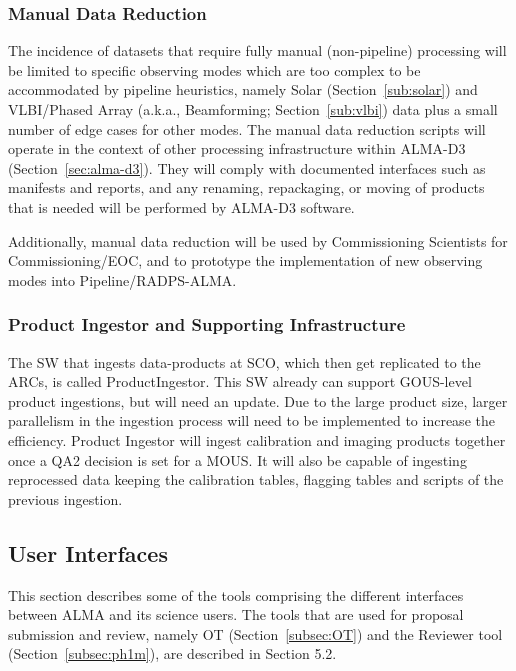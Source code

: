 \subsubsection{Manual Data Reduction}
\label{sec:mdr}

The incidence of datasets that require fully manual (non-pipeline) processing will be limited to specific observing modes which are too complex to be accommodated by pipeline heuristics, namely Solar (Section~\ref{sub:solar}) and VLBI/Phased Array (a.k.a., Beamforming; Section~\ref{sub:vlbi}) data plus a small number of edge cases for other modes. The manual data reduction scripts will operate in the context of other processing infrastructure within ALMA-D3 (Section~\ref{sec:alma-d3}). They will comply with documented interfaces such as manifests and reports, and any renaming, repackaging, or moving of products that is needed will be performed by ALMA-D3 software.

Additionally, manual data reduction will be used by Commissioning Scientists for Commissioning/\ac{EOC}, and to prototype the implementation of new observing modes into Pipeline/RADPS-ALMA.



\subsubsection{Product Ingestor and Supporting Infrastructure}

The SW that ingests data-products at SCO, which then get replicated to the ARCs, is called ProductIngestor. This SW already can support GOUS-level product ingestions, but will need an update. Due to the large product size, larger parallelism in the ingestion process will need to be implemented to increase the efficiency.  Product Ingestor will ingest calibration and imaging products together once a QA2 decision is set for a MOUS. It will also be capable of ingesting reprocessed data keeping the calibration tables, flagging tables and scripts of the previous ingestion.

\subsection{User Interfaces}


This section describes some of the tools comprising the different interfaces between ALMA and its science users. The tools that are used for proposal submission and review, namely \ac{OT} (Section~\ref{subsec:OT}) and the Reviewer tool (Section~\ref{subsec:ph1m}), are described in Section 5.2.

